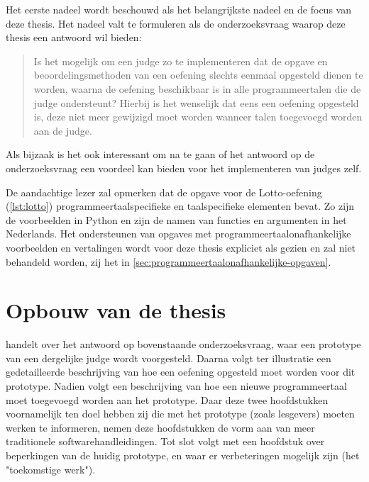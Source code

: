 Het eerste nadeel wordt beschouwd als het belangrijkste nadeel en de focus van deze thesis.
Het nadeel valt te formuleren als de onderzoeksvraag waarop deze thesis een antwoord wil bieden:

\begin{quote}
    Is het mogelijk om een judge zo te implementeren dat de opgave en beoordelingsmethoden van een oefening slechts eenmaal opgesteld dienen te worden, waarna de oefening beschikbaar is in alle programmeertalen die de judge ondersteunt?
    Hierbij is het wenselijk dat eens een oefening opgesteld is, deze niet meer gewijzigd moet worden wanneer talen toegevoegd worden aan de judge.
\end{quote}

Als bijzaak is het ook interessant om na te gaan of het antwoord op de onderzoeksvraag een voordeel kan bieden voor het implementeren van judges zelf.

De aandachtige lezer zal opmerken dat de opgave voor de Lotto-oefening (\cref{lst:lotto}) programmeertaalspecifieke en taalspecifieke elementen bevat.
Zo zijn de voorbeelden in Python en zijn de namen van functies en argumenten in het Nederlands.
Het ondersteunen van opgaves met programmeertaalonafhankelijke voorbeelden en vertalingen wordt voor deze thesis expliciet als  gezien en zal niet behandeld worden, zij het in \cref{sec:programmeertaalonafhankelijke-opgaven}.

\section{Opbouw van de thesis}\label{sec:opbouw}

 handelt over het antwoord op bovenstaande onderzoeksvraag, waar een prototype van een dergelijke judge wordt voorgesteld.
Daarna volgt ter illustratie een gedetailleerde beschrijving van hoe een oefening opgesteld moet worden voor dit prototype.
Nadien volgt een beschrijving van hoe een nieuwe programmeertaal moet toegevoegd worden aan het prototype.
Daar deze twee hoofdstukken voornamelijk ten doel hebben zij die met het prototype (zoals lesgevers) moeten werken te informeren, nemen deze hoofdstukken de vorm aan van meer traditionele softwarehandleidingen.
Tot slot volgt met een hoofdstuk over beperkingen van de huidig prototype, en waar er verbeteringen mogelijk zijn (het "toekomstige werk").
